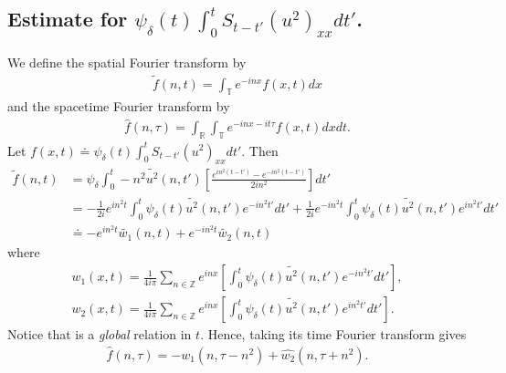 \documentclass[12pt,reqno]{amsart}
\numberwithin{equation}{section}  %
\renewcommand{\cref}{\Cref}
\newcommand{\rr}{\mathbb{R}}
\newcommand{\zz}{\mathbb{Z}}
\newcommand{\ci}{\mathbb{T}}
\newcommand{\wh}{\widehat}
\newcommand{\wt}{\widetilde}
\begin{document}
\begin{appendices}
\subsection{Estimate for $\psi_{\delta}(t) \int_{0}^{t} S_{t-t'} (u^{2})_{xx} dt'$.}
\label{ssec:non-lin-term}
We define the spatial Fourier transform by 
%
%
\begin{equation*}
\begin{split}
  \tilde{f}(n, t) = \int_{\ci} e^{-inx}f(x,t) dx
\end{split}
\end{equation*}
%
%
and the spacetime Fourier transform by
\begin{equation*}
\begin{split}
  \wh{f}(n, \tau) = \int_{\rr} \int_{\ci} e^{-inx-it\tau}f(x,t) dx dt.
\end{split}
\end{equation*}
%
%
Let $f(x,t) \doteq \psi_{\delta}(t) \int_{0}^{t} S_{t-t'} (u^{2})_{xx} dt'$. 
Then
%
%
\begin{equation}
  \begin{split}
    \wt{f}(n, t)
    & = \psi_{\delta} \int_{0}^{t}-n^{2}\wt{u^{2}}(n, t') \left[
    \frac{e^{in^{2}(t-t')} - e^{-in^{2}(t-t')}}{2 i n^{2}}
    \right] dt'
    \\
    & = - \frac{1}{2i} e^{in^{2}t} \int_{0}^{t} \psi_{\delta}(t) \wt{u^{2}}(n, t')
    e^{-in^{2}t'} dt' + 
    \frac{1}{2i} e^{-in^{2}t} \int_{0}^{t} \psi_{\delta}(t) \wt{u^{2}}(n, t')
    e^{in^{2}t'} dt' \\
    & \doteq - e^{in^{2}t} \wt{w_1}(n, t) + e^{-in^{2}t} \wt{w_2}(n, t)
  \end{split}
  \label{space-four-trans}
\end{equation}
%
where
%
%
\begin{gather*}
  w_{1}(x,t) = \frac{1}{4 i \pi} \sum_{n \in \zz} e^{inx} \left[ \int_{0}^{t}
  \psi_{\delta}(t) \wt{u^{2}}(n, t') e^{-in^{2}t'}
  dt'\right],
  \\
  w_{2}(x,t) = \frac{1}{4 i\pi} \sum_{n \in \zz} e^{inx} \left[ \int_{0}^{t} \psi_{\delta}(t) \wt{u^{2}}(n, t') e^{in^{2}t'} dt'
 \right].
\end{gather*}
%
%
%
Notice that \cref{space-four-trans} is a \emph{global} relation in $t$.
Hence, taking its time Fourier transform gives
%
%
\begin{equation}
  \label{full-fourier-trans-exp}
\begin{split}
  \wh{f}(n, \tau) = -\wh{w_{1}}(n, \tau - n^{2}) + \wh{w_{2}}(n, \tau +
  n^{2}).
\end{split}

\end{equation}
\end{appendices}
\end{document}
